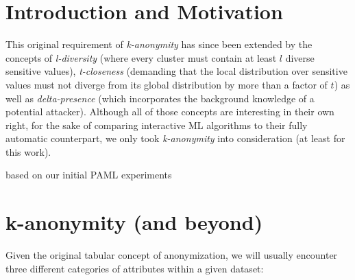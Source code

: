 \documentclass{llncs}
\begin{document}
\renewcommand{\thesubfigure}{\thefigure.\arabic{subfigure}}
\makeatletter
\renewcommand{\p@subfigure}{}
\renewcommand{\@thesubfigure}{\thesubfigure:\hskip\subfiglabelskip}
\makeatother


\section{Introduction and Motivation}
\label{sect:intro_moti}



This original requirement of \textit{k-anonymity} \cite{Sweeney:2002:k-Anonymity} has since been extended by the concepts of \textit{l-diversity} \cite{MachanavajjhalaEtAl:2007:l-Diversity} (where every cluster must contain at least $l$ diverse sensitive values), \textit{t-closeness} \cite{LiEtAl:2007:t-closeness} (demanding that the local distribution over sensitive values must not diverge from its global distribution by more than a factor of $t$) as well as \textit{delta-presence} \cite{NergizClifton:2010:Delta-Presence} (which incorporates the background knowledge of a potential attacker). Although all of those concepts are interesting in their own right, for the sake of comparing interactive ML algorithms to  their fully automatic counterpart, we only took \textit{k-anonymity} into consideration (at least for this work).

based on our initial PAML experiments \cite{}



\section{k-anonymity (and beyond)}
\label{sect:k_anon}

Given the original tabular concept of anonymization, we will usually encounter three different categories of attributes within a given dataset:
\end{document}
